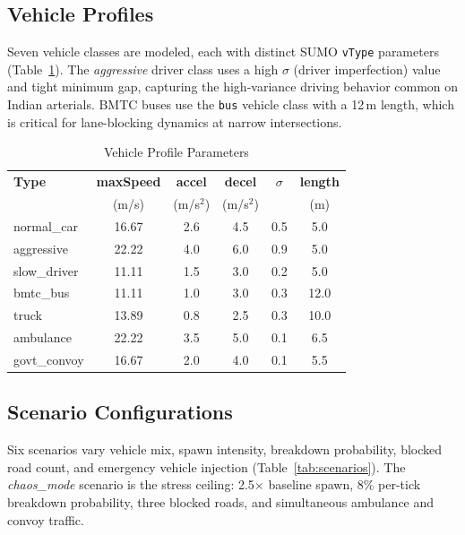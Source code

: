 \documentclass[conference]{IEEEtran}
\begin{document}
\subsection{Vehicle Profiles}

Seven vehicle classes are modeled, each with distinct SUMO \texttt{vType}
parameters (Table~\ref{tab:vehicles}). The \textit{aggressive} driver class
uses a high $\sigma$ (driver imperfection) value and tight minimum gap,
capturing the high-variance driving behavior common on Indian arterials.
BMTC buses use the \texttt{bus} vehicle class with a 12\,m length, which
is critical for lane-blocking dynamics at narrow intersections.

\begin{table}[!t]
\caption{Vehicle Profile Parameters}
\label{tab:vehicles}
\centering
\renewcommand{\arraystretch}{1.2}
\begin{tabular}{lccccc}
\toprule
\textbf{Type} & \textbf{maxSpeed} & \textbf{accel} & \textbf{decel} & \textbf{$\sigma$} & \textbf{length} \\
              & (m/s)             & (m/s$^2$)      & (m/s$^2$)      &                   & (m) \\
\midrule
normal\_car   & 16.67 & 2.6 & 4.5 & 0.5 & 5.0  \\
aggressive    & 22.22 & 4.0 & 6.0 & 0.9 & 5.0  \\
slow\_driver  & 11.11 & 1.5 & 3.0 & 0.2 & 5.0  \\
bmtc\_bus     & 11.11 & 1.0 & 3.0 & 0.3 & 12.0 \\
truck         & 13.89 & 0.8 & 2.5 & 0.3 & 10.0 \\
ambulance     & 22.22 & 3.5 & 5.0 & 0.1 & 6.5  \\
govt\_convoy  & 16.67 & 2.0 & 4.0 & 0.1 & 5.5  \\
\bottomrule
\end{tabular}
\end{table}

\subsection{Scenario Configurations}

Six scenarios vary vehicle mix, spawn intensity, breakdown probability,
blocked road count, and emergency vehicle injection (Table~\ref{tab:scenarios}).
The \textit{chaos\_mode} scenario is the stress ceiling: 2.5$\times$ baseline
spawn, 8\% per-tick breakdown probability, three blocked roads, and simultaneous
ambulance and convoy traffic.
\end{document}
